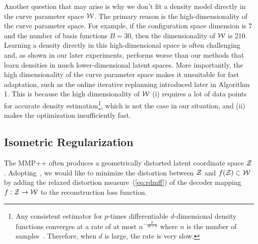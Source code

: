 Another question that may arise is why we don't fit a density model directly in the curve parameter space \({\cal W}\). The primary reason is the high-dimensionality of the curve parameter space. For example, if the configuration space dimension is 7 and the number of basis functions \(B = 30\), then the dimensionality of \({\cal W}\) is 210. Learning a density directly in this high-dimensional space is often challenging and, as shown in our later experiments, performs worse than our methods that learn densities in much lower-dimensional latent spaces. More importantly, the high dimensionality of the curve parameter space makes it unsuitable for fast adaptation, such as the online iterative replanning introduced later in Algorithm 1. This is because the high dimensionality of \({\cal W}\) (i) requires a lot of data points for accurate density estimation\footnote{Any consistent estimator for $p$-times differentiable $d$-dimensional density functions converges at a rate of at most $n^{-\frac{p}{2p+d}}$ where \(n\) is the number of samples~\cite{stone1980optimal}. Therefore, when \(d\) is large, the rate is very slow.}, which is not the case in our situation, and (ii) makes the optimization insufficiently fast.

\subsection{Isometric Regularization} 
The MMP++ often produces a geometrically distorted latent coordinate space ${\cal Z}$. 
Adopting~\cite{yonghyeon2022regularized}, we would like to minimize the distortion between ${\cal Z}$ and $f({\cal Z}) \subset {\cal W}$ by adding the relaxed distortion measure~(\ref{eq:rdmff}) of the decoder mapping $f:{\cal Z} \to {\cal W}$ to the reconstruction loss function. 

